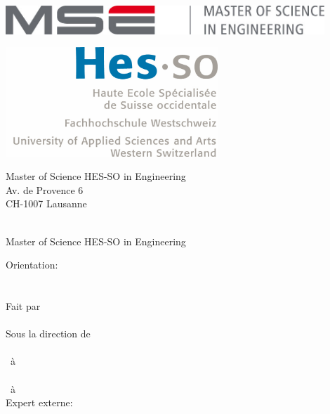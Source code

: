 
\begin{titlepage}
{\selectfont
	\begin{flushright}
		\begin{minipage}{0.5\textwidth}
			\begin{flushleft}
				\includegraphics[width=0.9\textwidth]{img/mse_logo}
			\end{flushleft}
		\end{minipage}%
		\begin{minipage}{0.5\textwidth}
			\begin{flushright}
				\includegraphics[width=0.6\textwidth]{img/hesso_logo}
			\end{flushright}
		\end{minipage}
		\begin{flushleft}
			\footnotesize
			Master of Science HES-SO in Engineering \\
			Av. de Provence 6 \\
			CH-1007 Lausanne
		\end{flushleft}
		~\\[0.5cm]
		
		{
		\Huge Master of Science HES-SO in Engineering\\[0.5cm]
		}
		
		{
		\LARGE Orientation: \Orientation\\[0.5cm]
		~\\[1cm]
		}
		{
			\Huge
			\ThesisTitle \\[1.5cm]
		}
		{
			\large
			Fait par\\[-0.3cm]
			\Huge \Author \\[0.8cm]
		}
		{
			\large
			Sous la direction de\\
			\Advisor \\
			\AdvisorResearchUnit \ à \AdvisorSchool\\
			\CoAdvisor \\
			\CoAdvisorResearchUnit \ à \CoAdvisorSchool \\[0.5cm]
		}
		{
			\large
			Expert externe: \\
			\Expert  \\
            \ExpertLab
		}
		\vfill
		

\end{flushright}}
\end{titlepage}
